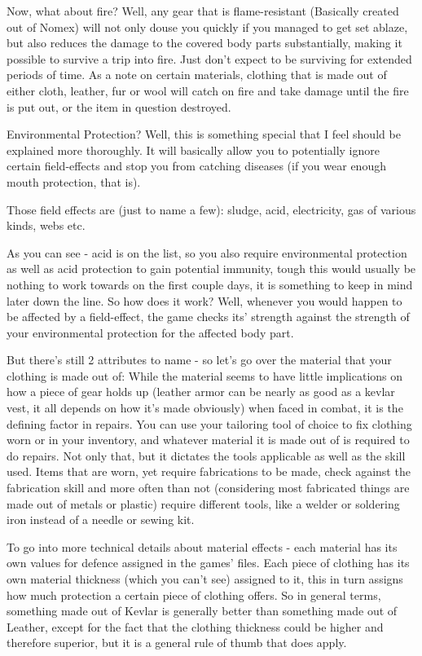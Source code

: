 \documentclass[11pt]{report}
\begin{document}
Now, what about fire? Well, any gear that is flame-resistant (Basically created out of Nomex) will not only douse you quickly if you managed to get set ablaze, but also reduces the damage to the covered body parts substantially, making it possible to survive a trip into fire. Just don't expect to be surviving for extended periods of time.
As a note on certain materials, clothing that is made out of either cloth, leather, fur or wool will catch on fire and take damage until the fire is put out, or the item in question destroyed.

Environmental Protection? Well, this is something special that I feel should be explained more thoroughly. It will basically allow you to potentially ignore certain field-effects and stop you from catching diseases (if you wear enough mouth protection, that is).

Those field effects are (just to name a few): sludge, acid, electricity, gas of various kinds, webs etc.

As you can see - acid is on the list, so you also require environmental protection as well as acid protection to gain potential immunity, tough this would usually be nothing to work towards on the first couple days, it is something to keep in mind later down the line.
So how does it work?
Well, whenever you would happen to be affected by a field-effect, the game checks its' strength against the strength of your environmental protection for the affected body part.

But there's still 2 attributes to name - so let's go over the material that your clothing is made out of: While the material seems to have little implications on how a piece of gear holds up (leather armor can be nearly as good as a kevlar vest, it all depends on how it's made obviously) when faced in combat, it is the defining factor in repairs. You can use your tailoring tool of choice to fix clothing worn or in your inventory, and whatever material it is made out of is required to do repairs. Not only that, but it dictates the tools applicable as well as the skill used. Items that are worn, yet require fabrications to be made, check against the fabrication skill and more often than not (considering most fabricated things are made out of metals or plastic) require different tools, like a welder or soldering iron instead of a needle or sewing kit.

To go into more technical details about material effects - each material has its own values for defence assigned in the games' files. Each piece of clothing has its own material thickness (which you can't see) assigned to it, this in turn assigns how much protection a certain piece of clothing offers. So in general terms, something made out of Kevlar is generally better than something made out of Leather, except for the fact that the clothing thickness could be higher and therefore superior, but it is a general rule of thumb that does apply.
\end{document}
